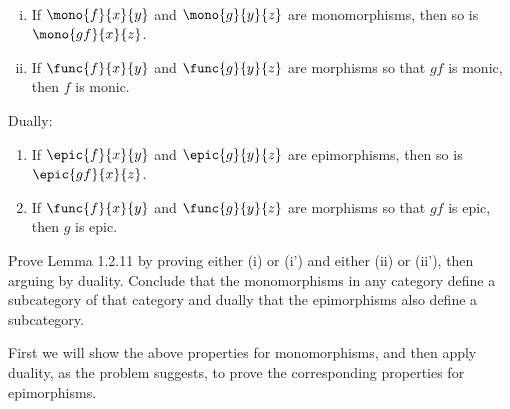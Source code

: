 \documentclass[main.tex]{subfiles}
\begin{document}
\paragraph{}
\begin{lemma}\leavevmode
	\begin{enumerate}[(i)]
		\item If \(\mono{f}{x}{y}\) and \(\mono{g}{y}{z}\) are monomorphisms,
			then so is \(\mono{gf}{x}{z}\).

		\item If \(\func{f}{x}{y}\) and \(\func{g}{y}{z}\) are morphisms so
			that \(gf\) is monic, then \(f\) is monic.
	\end{enumerate}
	Dually:
	\begin{enumerate}[(i')]
		\item If \(\epic{f}{x}{y}\) and \(\epic{g}{y}{z}\) are epimorphisms,
			then so is \(\epic{gf}{x}{z}\).

		\item If \(\func{f}{x}{y}\) and \(\func{g}{y}{z}\) are morphisms so
			that \(gf\) is epic, then \(g\) is epic.
	\end{enumerate}
\end{lemma}
\popthm

\begin{exercise}
	Prove Lemma 1.2.11 by proving either (i) or (i') and either (ii) or (ii'),
	then arguing by duality. Conclude that the monomorphisms in any category
	define a subcategory of that category and dually that the epimorphisms also
	define a subcategory.
\end{exercise}

First we will show the above properties for monomorphisms, and then apply
duality, as the problem suggests, to prove the corresponding properties for
epimorphisms.
\end{document}

